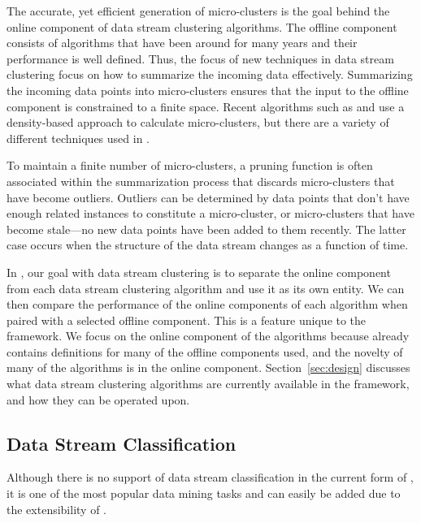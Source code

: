 \documentclass[nojss]{jss}
\begin{document}
The accurate, yet efficient generation of micro-clusters is the goal behind the online component of data stream clustering algorithms. The offline component consists of algorithms that have been around for many years and their performance is well defined. Thus, the focus of new techniques in data stream clustering focus on how to summarize the incoming data effectively. Summarizing the incoming data points into micro-clusters ensures that the input to the offline component is constrained to a finite space. Recent algorithms such as \citep{stream:Cao+Ester+Qian+Zhou:2006} and \citep{stream:Wan+Ng+Dang+Yu+Zhang:2009} use a density-based approach to calculate micro-clusters, but there are a variety of different techniques used in \citep{stream:Guha+Meyerson+Mishra+Motwani+O'Callaghan:2003, stream:Aggarwal:2009, stream:Hahsler+Dunham:2010c, stream:Aggarwal+Han+Wang+Yu:2003}. 


To maintain a finite number of micro-clusters, a pruning function is often associated within the summarization process that discards micro-clusters that have become outliers. Outliers can be determined by data points that don’t have enough related instances to constitute a micro-cluster, or micro-clusters that have become stale—no new data points have been added to them recently. The latter case occurs when the structure of the data stream changes as a function of time.


In , our goal with data stream clustering is to separate the online component from each data stream clustering algorithm and use it as its own entity. We can then compare the performance of the online components of each algorithm when paired with a selected offline component. This is a feature unique to the  framework. We focus on the online component of the algorithms because  already contains definitions for many of the offline components used, and the novelty of many of the algorithms is in the online component. Section~\ref{sec:design} discusses what data stream clustering algorithms are currently available in the framework, and how they can be operated upon.

\subsection{Data Stream Classification}
\label{sec:background:dscl}

Although there is no support of data stream classification in the current form of , it is one of the most popular data mining tasks and can easily be added due to the extensibility of . 
\end{document}
